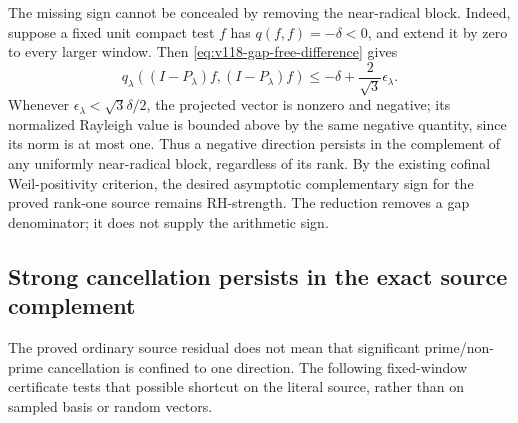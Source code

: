 \documentclass[11pt]{article}
\theoremstyle{remark}
\begin{document}
The missing sign cannot be concealed by removing the near-radical
block.  Indeed, suppose a fixed unit compact test $f$ has
$q(f,f)=-\delta<0$, and extend it by zero to every larger window.
Then \eqref{eq:v118-gap-free-difference} gives
\[
 q_\lambda((I-P_\lambda)f,(I-P_\lambda)f)
 \le-\delta+\frac{2}{\sqrt3}\epsilon_\lambda.
\]
Whenever $\epsilon_\lambda<\sqrt3\delta/2$, the projected vector
is nonzero and negative; its normalized Rayleigh value is bounded
above by the same negative quantity, since its norm is at most one.
Thus a negative direction persists in the complement of any uniformly
near-radical block, regardless of its rank.  By the existing cofinal
Weil-positivity criterion, the desired asymptotic complementary sign
for the proved rank-one source remains RH-strength.  The reduction
removes a gap denominator; it does not supply the arithmetic sign.

\subsection*{Strong cancellation persists in the exact source complement}

The proved ordinary source residual does not mean that significant
prime/non-prime cancellation is confined to one direction. The following
fixed-window certificate tests that possible shortcut on the literal
source, rather than on sampled basis or random vectors.
\end{document}
